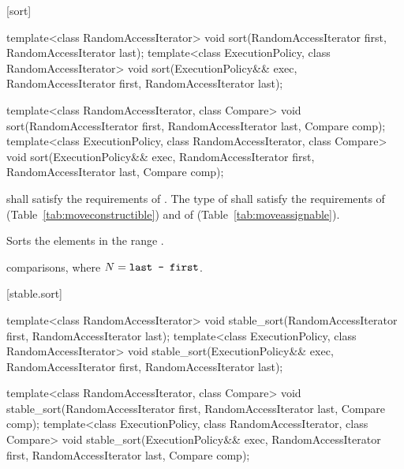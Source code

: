 [sort]{}

%
\begin{itemdecl}
template<class RandomAccessIterator>
  void sort(RandomAccessIterator first, RandomAccessIterator last);
template<class ExecutionPolicy, class RandomAccessIterator>
  void sort(ExecutionPolicy&& exec,
            RandomAccessIterator first, RandomAccessIterator last);

template<class RandomAccessIterator, class Compare>
  void sort(RandomAccessIterator first, RandomAccessIterator last,
            Compare comp);
template<class ExecutionPolicy, class RandomAccessIterator, class Compare>
  void sort(ExecutionPolicy&& exec,
            RandomAccessIterator first, RandomAccessIterator last,
            Compare comp);
\end{itemdecl}

\begin{itemdescr}
\pnum
\requires
{} shall satisfy the requirements of
. The type
of  shall satisfy the requirements of
 (Table~\ref{tab:moveconstructible}) and of
 (Table~\ref{tab:moveassignable}).

\pnum
\effects
Sorts the elements in the range
.

\pnum
\complexity
{} comparisons, where $N = \texttt{last - first}$.
\end{itemdescr}

[stable.sort]{}

%
\begin{itemdecl}
template<class RandomAccessIterator>
  void stable_sort(RandomAccessIterator first, RandomAccessIterator last);
template<class ExecutionPolicy, class RandomAccessIterator>
  void stable_sort(ExecutionPolicy&& exec,
                   RandomAccessIterator first, RandomAccessIterator last);

template<class RandomAccessIterator, class Compare>
  void stable_sort(RandomAccessIterator first, RandomAccessIterator last,
                   Compare comp);
template<class ExecutionPolicy, class RandomAccessIterator, class Compare>
  void stable_sort(ExecutionPolicy&& exec,
                   RandomAccessIterator first, RandomAccessIterator last,
                   Compare comp);
\end{itemdecl}

